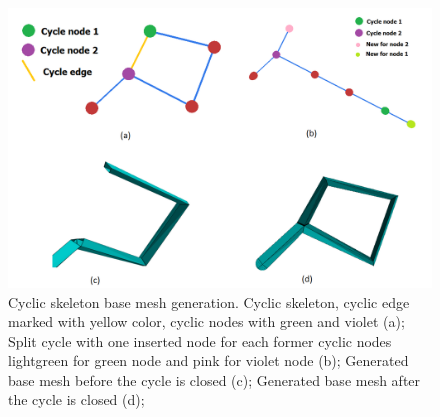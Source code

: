 \begin{figure}[ht]
    \centering
    \includegraphics[width=\textwidth]{images/cyclic_skeletons}
    \caption[Cyclic skeleton generation overview]{Cyclic skeleton base mesh generation. Cyclic skeleton, cyclic edge marked with yellow color, cyclic nodes with green and violet (a); Split cycle with one inserted node for each former cyclic nodes lightgreen for green node and pink for violet node (b); Generated base mesh before the cycle is closed (c); Generated base mesh after the cycle is closed (d);}
    \label{fig:cycle_ilu}
\end{figure}